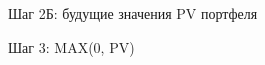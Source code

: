 \documentclass{beamer}
\begin{document}
\begin{frame}{Шаг 2Б: будущие значения PV портфеля}
\begin{figure}
\centering
\end{figure}
\end{frame}



\begin{frame}{Шаг 3: MAX(0, PV)}
\begin{figure}
\centering
\end{figure}
\end{frame}
\end{document}
